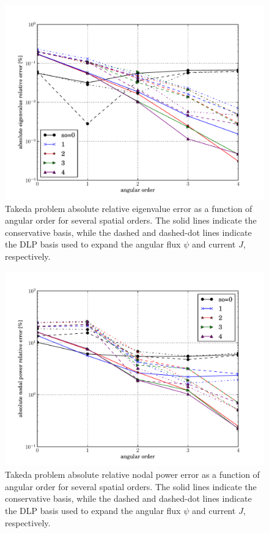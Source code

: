 \begin{figure}[ht]
    \centering
    \includegraphics[keepaspectratio, width = 5.0 in]
                    {takeda_order_study_eigenvalue_error}
    \caption{Takeda problem absolute relative eigenvalue error as 
             a function of angular order for several spatial orders.  
             The solid lines indicate the conservative basis, while the 
             dashed and dashed-dot lines indicate the DLP basis used to 
             expand the angular flux $\psi$ and current $J$, respectively.}
    \label{fig:takeda_order_study_eigenvalue_error}
\end{figure}

\begin{figure}[ht]
    \centering
    \includegraphics[keepaspectratio, width = 5.0 in]
                    {takeda_order_study_nodal_power_error}
    \caption{Takeda problem absolute relative nodal power error as 
             a function of angular order for several spatial orders.  
             The solid lines indicate the conservative basis, while the 
             dashed and dashed-dot lines indicate the DLP basis used to 
             expand the angular flux $\psi$ and current $J$, respectively.}
    \label{fig:takeda_order_study_nodal_power_error}
\end{figure}

